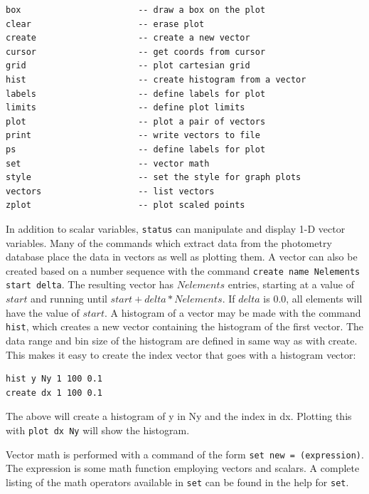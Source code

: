 \documentclass{article}
\begin{document}
\begin{verbatim}
box                       -- draw a box on the plot
clear                     -- erase plot
create                    -- create a new vector
cursor                    -- get coords from cursor
grid                      -- plot cartesian grid
hist                      -- create histogram from a vector
labels                    -- define labels for plot
limits                    -- define plot limits
plot                      -- plot a pair of vectors
print                     -- write vectors to file
ps                        -- define labels for plot
set                       -- vector math
style                     -- set the style for graph plots
vectors                   -- list vectors
zplot                     -- plot scaled points 
\end{verbatim}

In addition to scalar variables, {\tt status} can manipulate and
display 1-D vector variables.  Many of the commands which extract data
from the photometry database place the data in vectors as well as
plotting them.  A vector can also be created based on a number
sequence with the command {\tt create name Nelements start delta}.
The resulting vector has $Nelements$ entries, starting at a value of
$start$ and running until $start + delta*Nelements$.  If $delta$ is
0.0, all elements will have the value of $start$.  A histogram of a vector
may be made with the command {\tt hist}, which creates a new vector
containing the histogram of the first vector.  The data range and bin
size of the histogram are defined in same way as with create.  This
makes it easy to create the index vector that goes with a histogram
vector:  
\begin{verbatim}
hist y Ny 1 100 0.1
create dx 1 100 0.1
\end{verbatim}
The above will create a histogram of y in Ny and the index in dx.
Plotting this with {\tt plot dx Ny} will show the histogram.

Vector math is performed with a command of the form {\tt set new =
  (expression)}.  The expression is some math function employing
vectors and scalars.  A complete listing of the math operators
available in {\tt set} can be found in the help for {\tt set}.
\end{document}
